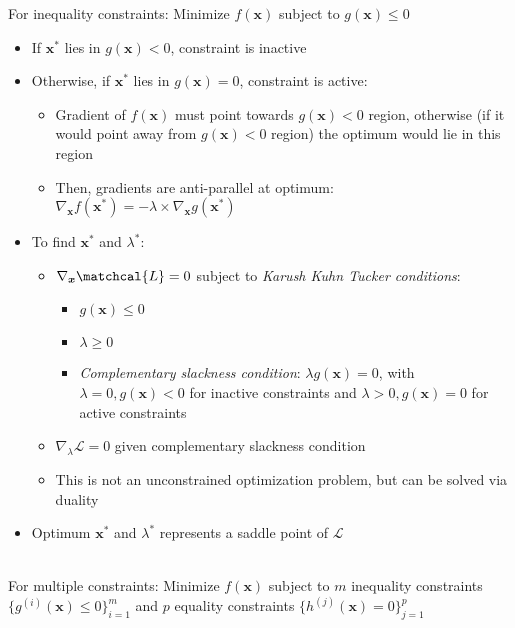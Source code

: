 For inequality constraints: Minimize $f(\boldsymbol{x})$ subject to $g(\boldsymbol{x}) \leq 0$ 
\begin{itemize}
    \item If $\boldsymbol{x^*}$ lies in $g(\boldsymbol{x}) < 0$, constraint is inactive
    \item Otherwise, if $\boldsymbol{x^*}$ lies in $g(\boldsymbol{x}) = 0$, constraint is active:
    \begin{itemize}
        \item Gradient of $f(\boldsymbol{x})$ must point towards $g(\boldsymbol{x}) < 0$ region, otherwise (if it would point away from $g(\boldsymbol{x}) < 0$ region) the optimum would lie in this region
        \item Then, gradients are anti-parallel at optimum: $\nabla_{\boldsymbol{x}} f(\boldsymbol{x^*}) = -\lambda \times \nabla_{\boldsymbol{x}} g(\boldsymbol{x^*})$
    \end{itemize}
    \item To find $\boldsymbol{x^*}$ and $\lambda^*$: 
    \begin{itemize}
        \item $\nabla_{\boldsymbol{x}} \matchcal{L} = 0$ subject to \emph{Karush Kuhn Tucker conditions}:
        \begin{itemize}
            \item $g(\boldsymbol{x}) \leq 0$
            \item $\lambda \geq 0$
            \item \emph{Complementary slackness condition}: $\lambda g(\boldsymbol{x}) = 0$, with $\lambda = 0, g(\boldsymbol{x}) < 0$ for inactive constraints and $\lambda > 0, g(\boldsymbol{x}) = 0$ for active constraints
        \end{itemize}
        \item $\nabla_{\lambda} \mathcal{L} = 0$ given complementary slackness condition
        \item This is not an unconstrained optimization problem, but can be solved via duality
    \end{itemize}
    \item Optimum $\boldsymbol{x^*}$ and $\lambda^*$ represents a saddle point of $\mathcal{L}$
\end{itemize}\\
For multiple constraints: Minimize $f(\boldsymbol{x})$ subject to $m$ inequality constraints $\{g^{(i)}(\boldsymbol{x}) \leq 0\}_{i=1}^m$ and $p$ equality constraints $\{h^{(j)}(\boldsymbol{x}) = 0\}_{j=1}^p$ 
